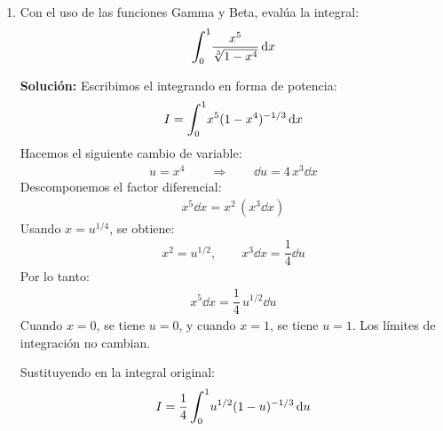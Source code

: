 \documentclass[hidelinks,12pt]{article}
\def\scaleint#1{\vcenter{\hbox{\scaleto[3ex]{\displaystyle\int}{#1}}}}
\def\bs{\mkern-12mu}
\begin{document}
\begin{enumerate}
\item \label{ejercicio_09} Con el uso de las funciones Gamma y Beta, evalúa la integral:
\begin{align*}
\scaleint{6ex}_{\bs 0}^{1} \dfrac{x^{5}}{\sqrt[3]{1 - x^{4}}} \dd{x}
\end{align*}

\noindent
\textbf{Solución: }Escribimos el integrando en forma de potencia:
\begin{align*}
    I = \scaleint{6ex}_{\bs 0}^{1} x^{5}(1 - x^{4})^{-1/3} \dd{x}
\end{align*}
Hacemos el siguiente cambio de variable:
\begin{align*}
    u = x^{4} \qquad \Rightarrow \qquad \dd{u} = 4 \, x^{3} \dd{x}
\end{align*}
Descomponemos el factor diferencial:
\begin{align*}
    x^{5} \dd{x} = x^{2} \,  \left(x^{3} \dd{x} \right)
\end{align*}
Usando $x = u^{1/4}$, se obtiene:
\begin{align*}
    x^{2} = u^{1/2}, \qquad x^{3} \dd{x} = \dfrac{1}{4} \dd{u}
\end{align*}
Por lo tanto:
\begin{align*}
    x^{5} \dd{x} = \dfrac{1}{4} \, u^{1/2} \dd{u}
\end{align*}
Cuando $x = 0$, se tiene $u = 0$, y cuando $x = 1$, se tiene $u = 1$. Los límites de integración no cambian.

Sustituyendo en la integral original:
\begin{align*}
    I = \dfrac{1}{4} \, \scaleint{6ex}_{\bs 0}^{1} u^{1/2}(1 - u)^{-1/3} \dd{u}
\end{align*}


\end{enumerate}
\end{document}
